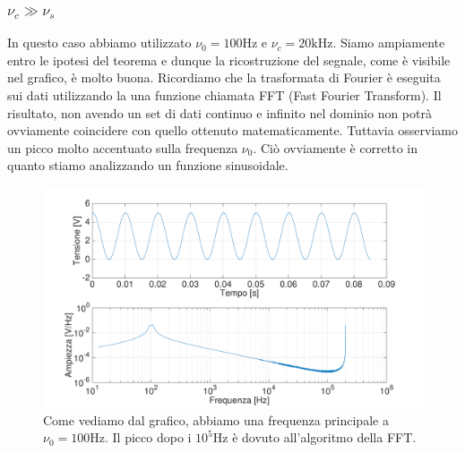 
\subsubsection{$\nu_c \gg \nu_s$}

In questo caso abbiamo utilizzato $\nu_0=100 \si{\hertz}$ e $\nu_c=20 \si{\kilo\hertz}$. Siamo ampiamente entro le ipotesi del teorema e dunque la ricostruzione del segnale, come è visibile nel grafico, è molto buona. Ricordiamo che la trasformata di Fourier è eseguita sui dati utilizzando la una funzione chiamata FFT (Fast Fourier Transform). Il risultato, non avendo un set di dati continuo e infinito nel dominio non potrà ovviamente coincidere con quello ottenuto matematicamente. Tuttavia osserviamo un picco molto accentuato sulla frequenza $\nu_0$. Ciò ovviamente è corretto in quanto stiamo analizzando un funzione sinusoidale.

\begin{figure}[H]
\centering
	\includegraphics[width=.73\textwidth]{../E13/latex/sin100hz@17000,200000.pdf}
	\caption{Come vediamo dal grafico, abbiamo una frequenza principale a $\nu_0=100 \si{\hertz}$. Il picco dopo i $10^5\si{\hertz}$ è dovuto all'algoritmo della FFT.}
	\label{sin1}
\end{figure}









